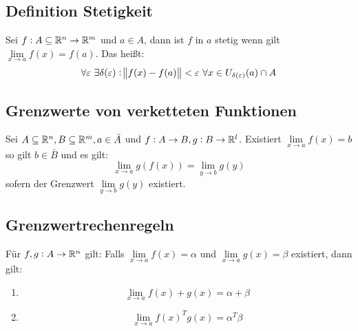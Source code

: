 \subsection{Definition Stetigkeit}
Sei $f: A \subseteq \mathbb{R}^n \rightarrow \mathbb{R}^m$ und $a \in A$, dann ist $f$ in $a$
stetig wenn gilt $\lim\limits_{x \rightarrow a} f(x) = f(a)$. Das heißt:
\begin{equation*}
    \forall\varepsilon\ \exists \delta(\varepsilon):
    \norm{f(x) - f(a)} < \varepsilon\ \forall x \in U_{\delta(\varepsilon)}(a)
    \cap A
\end{equation*}

\subsection{Grenzwerte von verketteten Funktionen}
Sei $A \subseteq \mathbb{R}^n, B \subseteq \mathbb{R}^m, a \in \bar{A}$ und $f: A \rightarrow B,
g: B \rightarrow \mathbb{R}^l$. Existiert $\lim\limits_{x \rightarrow a} f(x) = b$ so
gilt $b \in \bar{B}$ und es gilt:
\begin{equation*}
    \lim_{x \rightarrow a} g(f(x)) = \lim_{y \rightarrow b} g(y)
\end{equation*}
sofern der Grenzwert $\lim\limits_{y \rightarrow b} g(y)$ existiert.

\subsection{Grenzwertrechenregeln}
Für $f, g: A \rightarrow \mathbb{R}^n$ gilt: Falls $\lim\limits_{x \rightarrow a} f(x)
= \alpha$ und $\lim\limits_{x \rightarrow a} g(x) = \beta$ existiert, dann gilt:
\begin{enumerate}[label= (\alph*)]
    \item
        \begin{equation*}
            \lim_{x \rightarrow a} f(x) + g(x) = \alpha + \beta
        \end{equation*}
    \item
        \begin{equation*}
            \lim_{x \rightarrow a} {f(x)}^T g(x) = \alpha^T \beta
        \end{equation*}
\end{enumerate}
